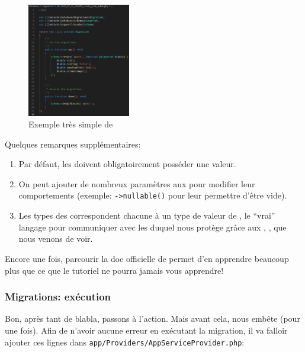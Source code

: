 \begin{figure}
    \vspace{-0.5cm}
    \includegraphics[width=0.4\textwidth]{figures-C1/post_migration.pdf}
    \caption{Exemple très simple de \migration{}\label{fig:basic_migration}}
\end{figure}
Quelques remarques supplémentaires:

\begin{enumerate}
    \item Par défaut, les \columns{} doivent obligatoirement posséder une valeur.
    \item On peut ajouter de nombreux paramètres aux \columns{} pour modifier leur comportements (exemple: \verb|->nullable()| pour leur permettre d'être vide).
    \item Les types des \column{} correspondent chacune à un type de valeur de \mysql{}, le ``vrai'' langage pour communiquer avec les \db{} duquel \laravel{} nous protège grâce aux \models{}, \migrations{}, \tables{} que nous venons de voir.
\end{enumerate}

Encore une fois, parcourir la doc officielle de \laravel{} permet d'en apprendre beaucoup plus que ce que le tutoriel ne pourra jamais vous apprendre!

\subsubsection[Migrations: exécution]{Migrations: exécution}

Bon, après tant de blabla, passons à l'action. Mais avant cela, \laravel{} nous embête (pour une fois). Afin de n'avoir aucune erreur en exécutant la migration, il va falloir ajouter ces lignes dans \verb|app/Providers/AppServiceProvider.php|:

